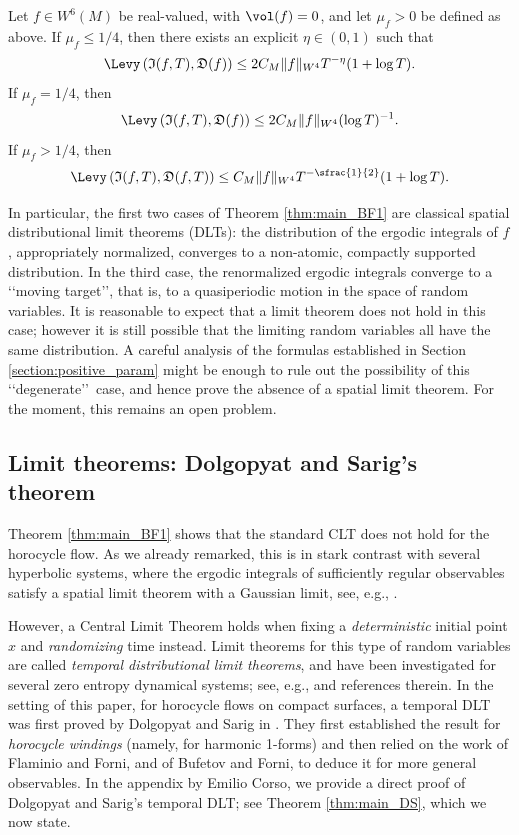 \begin{theorem}\label{thm:main_BF1}
Let $f \in W^6(M)$ be real-valued, with $\vol(f)=0$, and let $\mu_f >0 $ be defined as above.
If $\mu_f \leq 1/4$, then there exists an explicit $\eta \in (0,1)$ such that
\[
\Levy \left(\mathfrak{I}(f,T), \mathfrak{D}(f) \right) \leq 2C_M \|f\|_{W^4} T^{-\eta}(1+\log T).
\]
If $\mu_f=1/4$, then
\[
\Levy \left(\mathfrak{I}(f,T), \mathfrak{D}(f) \right) \leq 2C_M \|f\|_{W^4}(\log T)^{-1}.
\]
If $\mu_f > 1/4$, then
\[
\Levy \left(\mathfrak{I}(f,T), \mathfrak{D}(f,T) \right) \leq C_M \|f\|_{W^4} T^{-\sfrac{1}{2}}(1+\log T).
\]
\end{theorem}

In particular, the first two cases of Theorem \ref{thm:main_BF1} are classical spatial distributional limit theorems (DLTs): the distribution of the ergodic integrals of $f$, appropriately normalized, converges to a non-atomic, compactly supported distribution.
In the third case, the renormalized ergodic integrals converge to a \lq\lq moving target\rq\rq, that is, to a quasiperiodic motion in the space of random variables.
It is reasonable to expect that a limit theorem does not hold in this case; however it is still possible that the limiting random variables all have the same distribution. A careful analysis of the formulas established in Section \ref{section:positive_param} might be enough to rule out the possibility of this \lq\lq degenerate\rq\rq\ case, and hence prove the absence of a spatial limit theorem. For the moment, this remains an open problem.

\subsection{Limit theorems: Dolgopyat and Sarig's theorem}

Theorem \ref{thm:main_BF1} shows that the standard CLT does not hold for the horocycle flow. As we already remarked, this is in stark contrast with several hyperbolic systems, where the ergodic integrals of sufficiently regular observables satisfy a spatial limit theorem with a Gaussian limit, see, e.g., \cite{Rat:CLT}.

However, a Central Limit Theorem holds when fixing a \emph{deterministic} initial point $x$ and \emph{randomizing} time instead.
Limit theorems for this type of random variables are called \emph{temporal distributional limit theorems}, and have been investigated for several zero entropy dynamical systems; see, e.g., \cite{Bec1, Bec2, ADDS, Dolgopyat-Sarig, PaSo, BrUl} and references therein.
In the setting of this paper, \ie for horocycle flows on compact surfaces, a temporal DLT was first proved by Dolgopyat and Sarig in \cite{Dolgopyat-Sarig}. They first established the result for \emph{horocycle windings} (namely, for harmonic 1-forms) and then relied on the work of Flaminio and Forni, and of Bufetov and Forni, to deduce it for more general observables. In the appendix by Emilio Corso, we provide a direct proof of Dolgopyat and Sarig's temporal DLT; see Theorem \ref{thm:main_DS}, which we now state.

